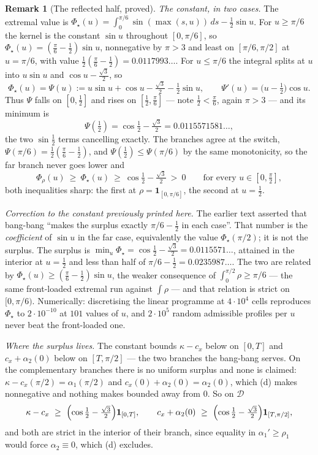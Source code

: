 \documentclass[11pt]{article}
\theoremstyle{definition}
\newtheorem{remark}[theorem]{Remark}
\begin{document}
\begin{remark}[The reflected half, proved]
\emph{The constant, in two cases.} The extremal value is
$\Phi_\star(u)=\int_0^{\pi/6}\sin(\max(s,u))\,ds-\tfrac12\sin u$. For $u\ge\pi/6$ the kernel is
the constant $\sin u$ throughout $[0,\pi/6]$, so
$\Phi_\star(u)=(\tfrac\pi6-\tfrac12)\sin u$, nonnegative by $\pi>3$ and least on
$[\pi/6,\pi/2]$ at $u=\pi/6$, with value $\tfrac12(\tfrac\pi6-\tfrac12)=0.0117993\ldots$. For
$u\le\pi/6$ the integral splits at $u$ into $u\sin u$ and $\cos u-\tfrac{\sqrt3}2$, so
\[
  \Phi_\star(u)=\Psi(u):=u\sin u+\cos u-\tfrac{\sqrt3}2-\tfrac12\sin u ,\qquad
  \Psi'(u)=\bigl(u-\tfrac12\bigr)\cos u .
\]
Thus $\Psi$ falls on $[0,\tfrac12]$ and rises on $[\tfrac12,\tfrac\pi6]$ --- note
$\tfrac12<\tfrac\pi6$, again $\pi>3$ --- and its minimum is
\[
  \Psi(\tfrac12)=\cos\tfrac12-\tfrac{\sqrt3}2=0.0115571581\ldots ,
\]
the two $\sin\tfrac12$ terms cancelling exactly. The branches agree at the switch,
$\Psi(\pi/6)=\tfrac12(\tfrac\pi6-\tfrac12)$, and $\Psi(\tfrac12)\le\Psi(\pi/6)$ by the same
monotonicity, so the far branch never goes lower and
\begin{equation}\label{eq:bbsurplus}
  \Phi_\rho(u)\ \ge\ \Phi_\star(u)\ \ge\ \cos\tfrac12-\tfrac{\sqrt3}2\ >\ 0
  \qquad\text{for every }u\in[0,\tfrac\pi2] ,
\end{equation}
both inequalities sharp: the first at $\rho=\mathbf 1_{[0,\pi/6]}$, the second at
$u=\tfrac12$.

\emph{Correction to the constant previously printed here.} The earlier text asserted that
bang-bang ``makes the surplus exactly $\pi/6-\tfrac12$ in each case''. That number is the
\emph{coefficient} of $\sin u$ in the far case, equivalently the value $\Phi_\star(\pi/2)$; it
is not the surplus. The surplus is
$\min_u\Phi_\star=\cos\tfrac12-\tfrac{\sqrt3}2=0.0115571\ldots$, attained in the interior at
$u=\tfrac12$ and less than half of $\pi/6-\tfrac12=0.0235987\ldots$. The two are related by
$\Phi_\star(u)\ge(\tfrac\pi6-\tfrac12)\sin u$, the weaker consequence of
$\int_0^{\pi/2}\rho\ge\pi/6$ --- the same front-loaded extremal run against $\int\rho$ --- and
that relation is strict on $[0,\pi/6)$. Numerically: discretising the linear programme at
$4\cdot10^4$ cells reproduces $\Phi_\star$ to $2\cdot10^{-10}$ at $101$ values of $u$, and
$2\cdot10^5$ random admissible profiles per $u$ never beat the front-loaded one.

\emph{Where the surplus lives.} The constant bounds $\kappa-c_x$ below on $[0,T]$ and
$c_x+\alpha_2(0)$ below on $[T,\pi/2]$ --- the two branches the bang-bang serves. On the
complementary branches there is no uniform surplus and none is claimed:
$\kappa-c_x(\pi/2)=\alpha_1(\pi/2)$ and $c_x(0)+\alpha_2(0)=\alpha_2(0)$, which (d) makes
nonnegative and nothing makes bounded away from $0$. So on $\mathcal D$
\[
  \kappa-c_x\ \ge\ \Bigl(\cos\tfrac12-\tfrac{\sqrt3}2\Bigr)\mathbf 1_{[0,T]},\qquad
  c_x+\alpha_2(0)\ \ge\ \Bigl(\cos\tfrac12-\tfrac{\sqrt3}2\Bigr)\mathbf 1_{[T,\pi/2]} ,
\]
and both are strict in the interior of their branch, since equality in $\alpha_1'\ge\rho_1$
would force $\alpha_2\equiv0$, which (d) excludes.


\end{remark}
\end{document}
